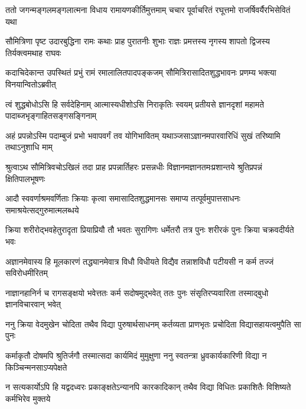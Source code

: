 


\fourlineindentedshloka
{ततो जगन्मङ्गलमङ्गलात्मना}
{विधाय रामायणकीर्तिमुत्तमाम्}
{चचार पूर्वाचरितं रघूत्तमो}
{राजर्षिवर्यैरभिसेवितं यथा} %

\fourlineindentedshloka
{सौमित्रिणा पृष्ट उदारबुद्धिना}
{रामः कथाः प्राह पुरातनीः शुभाः}
{राज्ञः प्रमत्तस्य नृगस्य शापतो}
{द्विजस्य तिर्यक्त्वमथाह राघवः} %

\fourlineindentedshloka
{कदाचिदेकान्त उपस्थितं प्रभुं}
{रामं रमालालितपादपङ्कजम्}
{सौमित्रिरासादितशुद्धभावनः}
{प्रणम्य भक्त्या विनयान्वितोऽब्रवीत्} %

\fourlineindentedshloka
{त्वं शुद्धबोधोऽसि हि सर्वदेहिनाम्}
{आत्मास्यधीशोऽसि निराकृतिः स्वयम्}
{प्रतीयसे ज्ञानदृशां महामते}
{पादाब्जभृङ्गाहितसङ्गसङ्गिनाम्} %

\fourlineindentedshloka
{अहं प्रपन्नोऽस्मि पदाम्बुजं प्रभो}
{भवापवर्गं तव योगिभावितम्}
{यथाञ्जसाऽज्ञानमपारवारिधिं}
{सुखं तरिष्यामि तथाऽनुशाधि माम्} %

\fourlineindentedshloka
{श्रुत्वाऽथ सौमित्रिवचोऽखिलं तदा}
{प्राह प्रपन्नार्तिहरः प्रसन्नधीः}
{विज्ञानमज्ञानतमःप्रशान्तये}
{श्रुतिप्रपन्नं क्षितिपालभूषणः} %

\fourlineindentedshloka
{आदौ स्ववर्णाश्रमवर्णिताः क्रियाः}
{कृत्वा समासादितशुद्धमानसः}
{समाप्य तत्पूर्वमुपात्तसाधनः}
{समाश्रयेत्सद्गुरुमात्मलब्धये} %

\fourlineindentedshloka
{क्रिया शरीरोद्भवहेतुरादृता}
{प्रियाप्रियौ तौ भवतः सुरागिणः}
{धर्मेतरौ तत्र पुनः शरीरकं}
{पुनः क्रिया चक्रवदीर्यते भवः} %

\fourlineindentedshloka
{अज्ञानमेवास्य हि मूलकारणं}
{तद्ध्यानमेवात्र विधौ विधीयते}
{विद्यैव तन्नाशविधौ पटीयसी}
{न कर्म तज्जं सविरोधमीरितम्} %

\fourlineindentedshloka
{नाज्ञानहानिर्न च रागसङ्क्षयो}
{भवेत्ततः कर्म सदोषमुद्भवेत्}
{ततः पुनः संसृतिरप्यवारिता}
{तस्माद्बुधो ज्ञानविचारवान् भवेत्} %

\fourlineindentedshloka
{ननु क्रिया वेदमुखेन चोदिता}
{तथैव विद्या पुरुषार्थसाधनम्}
{कर्तव्यता प्राणभृतः प्रचोदिता}
{विद्यासहायत्वमुपैति सा पुनः} %

\fourlineindentedshloka
{कर्माकृतौ दोषमपि श्रुतिर्जगौ}
{तस्मात्सदा कार्यमिदं मुमुक्षुणा}
{ननु स्वतन्त्रा ध्रुवकार्यकारिणी}
{विद्या न किञ्चिन्मनसाऽप्यपेक्षते} %

\fourlineindentedshloka
{न सत्यकार्योऽपि हि यद्वदध्वरः}
{प्रकाङ्क्षतेऽन्यानपि कारकादिकान्}
{तथैव विद्या विधितः प्रकाशितैः}
{विशिष्यते कर्मभिरेव मुक्तये} %

